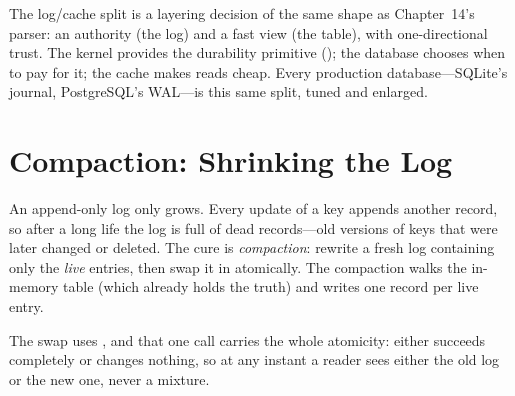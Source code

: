 \begin{osconcept}
The log/cache split is a layering decision of the same shape as
Chapter~14's parser: an authority (the log) and a fast view (the
table), with one-directional trust. The kernel provides the durability
primitive (); the database chooses when to pay for it; the
cache makes reads cheap. Every production database---SQLite's journal,
PostgreSQL's WAL---is this same split, tuned and enlarged.
\end{osconcept}

\section{Compaction: Shrinking the Log}

An append-only log only grows. Every update of a key appends another
record, so after a long life the log is full of dead records---old
versions of keys that were later changed or deleted. The cure is
\emph{compaction}: rewrite a fresh log containing only the \emph{live}
entries, then swap it in atomically. The compaction walks the in-memory
table (which already holds the truth) and writes one  record
per live entry.

The swap uses , and that one call carries the whole
atomicity:  either succeeds completely or changes nothing,
so at any instant a reader sees either the old log or the new one,
never a mixture.

